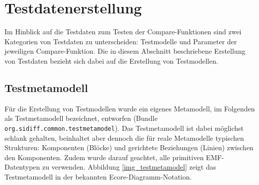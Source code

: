 %
%

\chapter{Testdatenerstellung}
\label{chap:testdata}

Im Hinblick auf die Testdaten zum Testen der Compare-Funktionen sind zwei Kategorien von Testdaten zu unterscheiden: Testmodelle und Parameter der jeweiligen Compare-Funktion. Die in diesem Abschnitt beschriebene Erstellung von Testdaten bezieht sich dabei auf die Erstellung von Testmodellen.

\section{Testmetamodell}
Für die Erstellung von Testmodellen wurde ein eigenes Metamodell, im Folgenden als Testmetamodell bezeichnet, entworfen (Bundle  \texttt{org.sidiff.common.testmetamodel}). Das Testmetamodell ist dabei möglichst schlank gehalten, beinhaltet aber dennoch die für reale Metamodelle typischen Strukturen: Komponenten (Blöcke) und gerichtete Beziehungen (Linien) zwischen den Komponenten. Zudem wurde darauf geachtet, alle primitiven EMF-Datentypen zu verwenden. Abbildung \ref{img_testmetamodel} zeigt das Testmetamodell in der bekannten Ecore-Diagramm-Notation.

